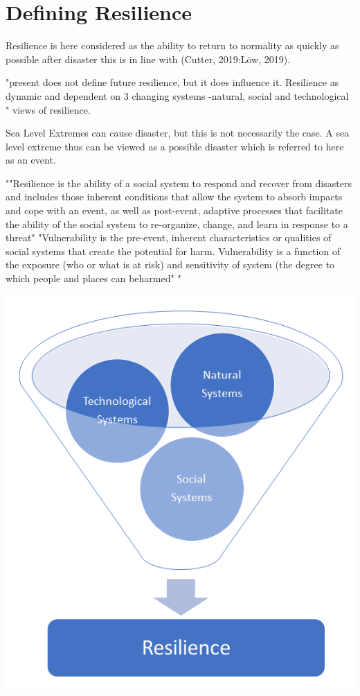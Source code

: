 \documentclass{article}
\begin{document}
\section{Defining Resilience} 
Resilience is here considered as the ability to return to normality as quickly as possible after disaster this is in line with (Cutter, 2019:Löw, 2019).

"present does not define future resilience, but it does influence it. Resilience as dynamic and dependent on 3 changing systems -natural, social and technological
" \cite{cutter_community_2020} views of resilience.

Sea Level Extremes can cause disaster, but this is not necessarily the case. A sea level extreme thus can be viewed as a possible disaster which is referred to here as an event. 

""Resilience is the ability of a social system to respond and recover from disasters and includes those inherent conditions that allow the system to absorb impacts and cope with an event, as well as post-event, adaptive processes that facilitate the ability of the social system to re-organize, change, and learn in response to a threat" "Vulnerability is the pre-event, inherent characteristics or qualities of social systems that create the potential for harm. Vulnerability is a function of the exposure (who or what is at risk) and sensitivity of system (the degree to which people and places can beharmed" " \cite{cutter_place-based_2008}

\includegraphics[scale=0.5]{fig_theory/resilience model .png}
\end{document}
